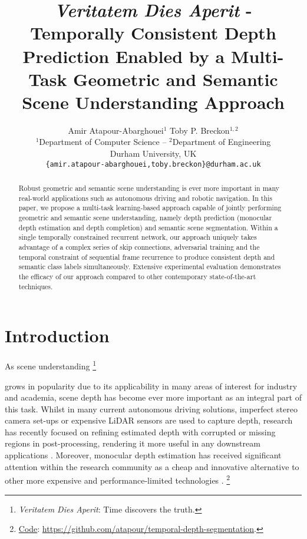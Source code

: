 \documentclass[10pt,twocolumn,letterpaper]{article}
\newcommand\blfootnote[1]{\begingroup
	\renewcommand\thefootnote{}\footnote{#1}\addtocounter{footnote}{-1}\endgroup
}
\begin{document}
\title{\textit{Veritatem Dies Aperit} - Temporally Consistent Depth Prediction Enabled by a Multi-Task Geometric and Semantic Scene Understanding Approach}

\author{Amir Atapour-Abarghouei$^1$ \quad Toby P. Breckon$^{1,2}$\\
	$^{1}$Department of Computer Science -- $^{2}$Department of Engineering\\
	Durham University, UK\\
	{\tt\small \{amir.atapour-abarghouei,toby.breckon\}@durham.ac.uk}}

\maketitle
\thispagestyle{empty}

\begin{abstract}
   Robust geometric and semantic scene understanding is ever more important in many real-world applications such as autonomous driving and robotic navigation. In this paper, we propose a multi-task learning-based approach capable of jointly performing geometric and semantic scene understanding, namely depth prediction (monocular depth estimation and depth completion) and semantic scene segmentation. Within a single temporally constrained recurrent network, our approach uniquely takes advantage of a complex series of skip connections, adversarial training and the temporal constraint of sequential frame recurrence to produce consistent depth and semantic class labels simultaneously. Extensive experimental evaluation demonstrates the efficacy of our approach compared to other contemporary state-of-the-art techniques.\vspace{-0.50cm}\end{abstract}\vspace{-0.15cm}

\section{Introduction}
\label{sec:intro}\vspace{-0.1cm}

As scene understanding\blfootnote{\textit{Veritatem Dies Aperit}: Time discovers the truth.} grows in popularity due to its applicability in many areas of interest for industry and academia, scene depth has become ever more important as an integral part of this task. Whilst in many current autonomous driving solutions, imperfect stereo camera set-ups or expensive LiDAR sensors are used to capture depth, research has recently focused on refining estimated depth with corrupted or missing regions in post-processing, rendering it more useful in any downstream applications \cite{abarghouei18review, xue2017depth, zhang2018deep}. Moreover, monocular depth estimation has received significant attention within the research community as a cheap and innovative alternative to other more expensive and performance-limited technologies \cite{atapour2018real, eigen2015predicting, monodepth17, zhou2017unsupervised}.\blfootnote{\href{https://github.com/atapour/temporal-depth-segmentation}{Code}: \href{https://github.com/atapour/temporal-depth-segmentation}{https://github.com/atapour/temporal-depth-segmentation}.}
\end{document}
